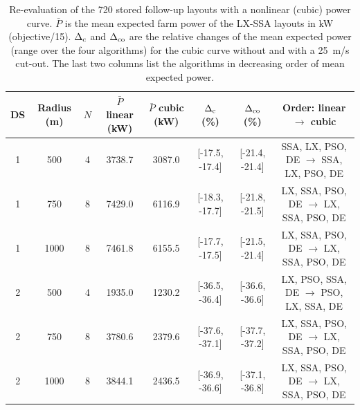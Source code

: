 \begin{table}[!t]
\centering
\caption{Re-evaluation of the 720 stored follow-up layouts with a nonlinear (cubic) power curve. $\bar P$ is the mean expected farm power of the LX-SSA layouts in kW (objective/15). $\Delta_{\rm c}$ and $\Delta_{\rm co}$ are the relative changes of the mean expected power (range over the four algorithms) for the cubic curve without and with a 25~m/s cut-out. The last two columns list the algorithms in decreasing order of mean expected power.}
\label{tab:powercurve}
\footnotesize\setlength{\tabcolsep}{4pt}
\begin{tabular}{cccccccc}
\toprule
DS & Radius (m) & $N$ & $\bar P$ linear (kW) & $\bar P$ cubic (kW) & $\Delta_{\rm c}$ (\%) & $\Delta_{\rm co}$ (\%) & Order: linear $\rightarrow$ cubic \\
\midrule
1 & 500 & 4 & 3738.7 & 3087.0 & [-17.5, -17.4] & [-21.4, -21.4] & SSA, LX, PSO, DE $\rightarrow$ SSA, LX, PSO, DE \\
1 & 750 & 8 & 7429.0 & 6116.9 & [-18.3, -17.7] & [-21.8, -21.5] & LX, SSA, PSO, DE $\rightarrow$ LX, SSA, PSO, DE \\
1 & 1000 & 8 & 7461.8 & 6155.5 & [-17.7, -17.5] & [-21.5, -21.4] & LX, SSA, PSO, DE $\rightarrow$ LX, SSA, PSO, DE \\
2 & 500 & 4 & 1935.0 & 1230.2 & [-36.5, -36.4] & [-36.6, -36.6] & LX, PSO, SSA, DE $\rightarrow$ PSO, LX, SSA, DE \\
2 & 750 & 8 & 3780.6 & 2379.6 & [-37.6, -37.1] & [-37.7, -37.2] & LX, SSA, PSO, DE $\rightarrow$ LX, SSA, PSO, DE \\
2 & 1000 & 8 & 3844.1 & 2436.5 & [-36.9, -36.6] & [-37.1, -36.8] & LX, SSA, PSO, DE $\rightarrow$ LX, SSA, PSO, DE \\
\bottomrule
\end{tabular}
\end{table}

